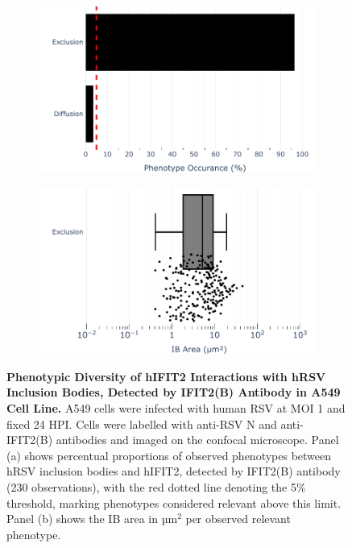 \begin{figure}
    \begin{subfigure}{0.495\textwidth}
        \caption{}
        \includegraphics[width=1\linewidth]{08. Chapter 3/Figs/02. Infection/02. IFIT2/02. IFIT2B/01. bar_i2b_a549.pdf}
    \end{subfigure}
    \begin{subfigure}{0.495\textwidth}
        \caption{}
        \includegraphics[width=1\linewidth]{08. Chapter 3/Figs/02. Infection/02. IFIT2/02. IFIT2B/02. box_i2b_a549.pdf}
    \end{subfigure}
    \caption[Phenotypic Diversity of hIFIT2 Interactions with hRSV Inclusion Bodies, Detected by IFIT2(B) Antibody in A549 Cell Line.]{\textbf{Phenotypic Diversity of hIFIT2 Interactions with hRSV Inclusion Bodies, Detected by IFIT2(B) Antibody in A549 Cell Line.} A549 cells were infected with human RSV at MOI 1 and fixed 24 HPI. Cells were labelled with anti-RSV N and anti-IFIT2(B) antibodies and imaged on the confocal microscope. Panel (a) shows percentual proportions of observed phenotypes between hRSV inclusion bodies and hIFIT2, detected by IFIT2(B) antibody (230 observations), with the red dotted line denoting the 5\% threshold, marking phenotypes considered relevant above this limit. Panel (b) shows the IB area in \(\mbox{µm}^2\) per observed relevant phenotype.}
    \label{fig:Phenotypic Diversity of hIFIT2 Interactions with hRSV Inclusion Bodies, Detected by IFIT2(B) Antibody in A549 Cell Line}
\end{figure}


